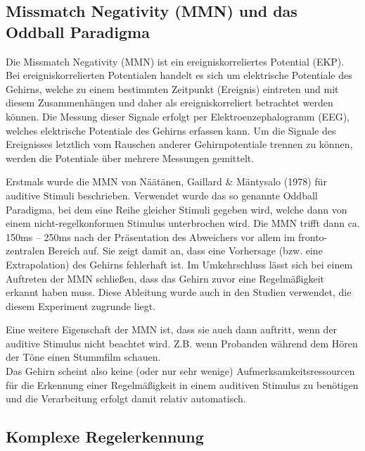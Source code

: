 \documentclass[doc,a4paper,12pt]{apa6}
\begin{document}
\subsection{Missmatch Negativity (MMN) und das Oddball Paradigma}

Die Missmatch Negativity (MMN) ist ein ereigniskorreliertes Potential (EKP). Bei ereigniskorrelierten Potentialen handelt es sich um elektrische Potentiale des Gehirns, welche zu einem bestimmten Zeitpunkt (Ereignis) eintreten und mit diesem Zusammenhängen und daher als ereigniskorreliert betrachtet werden können. Die Messung dieser Signale erfolgt per Elektroenzephalogramm (EEG), welches elektrische Potentiale des Gehirns erfassen kann. Um die Signale des Ereignisses letztlich vom Rauschen anderer Gehirnpotentiale trennen zu können, werden die Potentiale über mehrere Messungen gemittelt.

Erstmals wurde die MMN von Näätänen, Gaillard \& Mäntysalo (1978) für auditive Stimuli beschrieben. Verwendet wurde das so genannte Oddball Paradigma, bei dem eine Reihe gleicher Stimuli gegeben wird, welche dann von einem nicht-regelkonformen Stimulus unterbrochen wird. Die MMN trifft dann ca. 150ms – 250ms nach der Präsentation des Abweichers vor allem im fronto-zentralen Bereich auf. Sie zeigt damit an, dass eine Vorhersage (bzw. eine Extrapolation) des Gehirns fehlerhaft ist. Im Umkehrschluss lässt sich bei einem Auftreten der MMN schließen, dass das Gehirn zuvor eine Regelmäßigkeit erkannt haben muss. Diese Ableitung wurde auch in den Studien verwendet, die diesem Experiment zugrunde liegt.

Eine weitere Eigenschaft der MMN ist, dass sie auch dann auftritt, wenn der auditive Stimulus nicht beachtet wird. Z.B. wenn Probanden während dem Hören der Töne einen Stummfilm schauen.\\
Das Gehirn scheint also keine (oder nur sehr wenige) Aufmerksamkeitsressourcen für die Erkennung einer Regelmäßigkeit in einem auditiven Stimulus zu benötigen und die Verarbeitung erfolgt damit relativ automatisch.

\subsection{Komplexe Regelerkennung}
\end{document}
